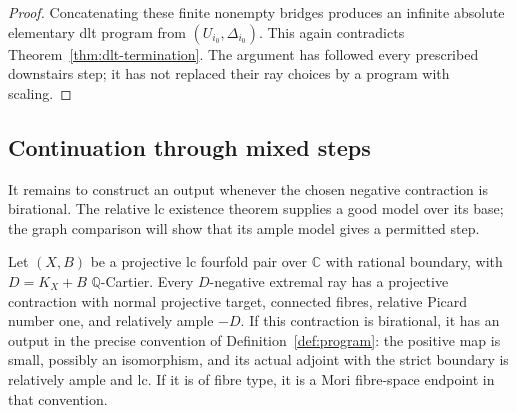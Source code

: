 \begin{proof}
Concatenating these finite nonempty bridges produces an infinite
absolute elementary dlt program from $(U_{i_0},\Delta_{i_0})$.
This again contradicts Theorem~\ref{thm:dlt-termination}.  The
argument has followed every prescribed downstairs step; it has
not replaced their ray choices by a program with scaling.
\end{proof}

\subsection{Continuation through mixed steps}

It remains to construct an output whenever the chosen negative
contraction is birational.  The relative lc existence theorem supplies
a good model over its base; the graph comparison will show that its
ample model gives a permitted step.

\begin{proposition}\label{prop:continuation}
Let $(X,B)$ be a projective lc fourfold pair over $\mathbb C$ with rational boundary,
with $D=K_X+B$ $\mathbb Q$-Cartier.  Every $D$-negative extremal
ray has a projective contraction with normal projective target,
connected fibres, relative Picard number one, and relatively
ample $-D$.  If this contraction is birational, it has an output
in the precise convention of Definition~\ref{def:program}:
the positive map is small, possibly an isomorphism, and its
actual adjoint with the strict boundary is relatively ample
and lc.  If it is of fibre type, it is a Mori fibre-space
endpoint in that convention.
\end{proposition}

